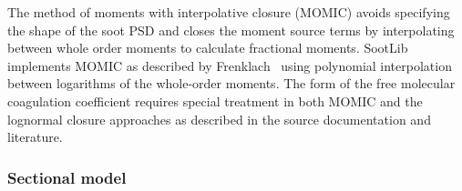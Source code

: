 \documentclass[preprint,letterpaper]{elsarticle}
\begin{document}
The method of moments with interpolative closure (MOMIC) avoids specifying the shape of the soot PSD and closes the moment source terms by interpolating between whole order moments to calculate fractional moments. 
SootLib implements MOMIC as described by Frenklach~\cite{Frenklach_2002b,Frenklach_1987}
using polynomial interpolation between logarithms of the whole-order moments. The form of the free molecular coagulation coefficient requires special treatment in both MOMIC and the lognormal closure approaches as described in the source documentation and literature.



\subsubsection{Sectional model}
\label{s:sectional}
\end{document}
